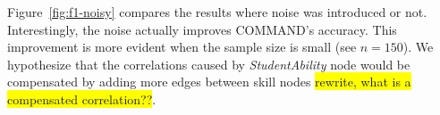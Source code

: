 \documentclass{edm_template}
\newcommand{\hl}[1]{\colorbox{yellow}{#1}}
\begin{document}
	Figure~\ref{fig:f1-noisy} compares the results where noise was introduced or not.
	Interestingly, the noise  actually improves COMMAND's  accuracy.
	This improvement is more evident when the sample size is small (see $n=150$).
	We hypothesize that the correlations caused by \emph{StudentAbility} node would be compensated by adding more edges between skill nodes \hl{rewrite, what is a compensated correlation??}. 

	
\end{document}
